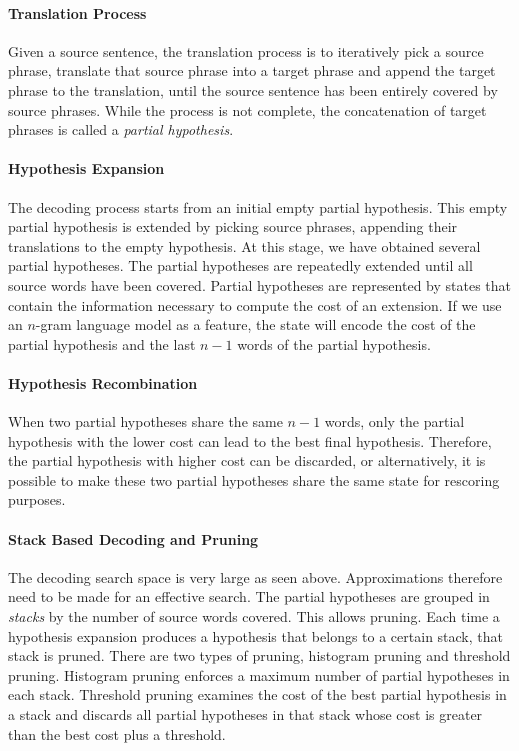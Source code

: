 \paragraph{Translation Process}

Given a source sentence, the translation process is to iteratively
pick a source phrase, translate that source phrase into a target phrase
and append the target phrase to the translation, until the source
sentence has been entirely covered by source phrases. While the process is not
complete, the concatenation of target phrases is called a
\emph{partial hypothesis}.

\paragraph{Hypothesis Expansion}

The decoding process starts from an initial empty partial hypothesis.
This empty partial hypothesis is extended by picking source phrases,
appending their translations to the empty hypothesis.
At this stage, we have obtained several partial hypotheses.
The partial hypotheses are repeatedly extended until
all source words have been covered.
Partial hypotheses are represented by states
that contain the information necessary to
compute the cost of an extension.
If we use an $n$-gram language model as a feature,
the state will encode the cost of the partial hypothesis
and the last $n - 1$ words of the partial hypothesis.

\paragraph{Hypothesis Recombination}

When two partial hypotheses share the same $n - 1$
words, only the partial hypothesis with the lower
cost can lead to the best final hypothesis. Therefore,
the partial hypothesis with higher cost can be discarded, or
alternatively, it is possible to make these two partial
hypotheses share the same state for rescoring purposes.

\paragraph{Stack Based Decoding and Pruning}

The decoding search space is very large
as seen above. Approximations
therefore need to be made for an effective search.
The partial hypotheses are grouped in \emph{stacks}
by the number of source words covered.
This allows pruning. Each time a hypothesis expansion produces a hypothesis that
belongs to a certain stack, that stack is pruned.
There are two types of pruning, histogram pruning and threshold
pruning. Histogram pruning enforces a maximum number
of partial hypotheses in each stack. Threshold pruning
examines the cost of the best partial hypothesis in a stack
and discards all partial hypotheses in that stack whose cost
is greater than the best cost plus a threshold.

